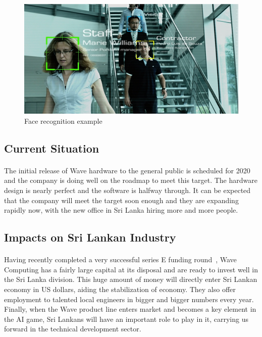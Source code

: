 \begin{figure}[H]
    \centering
    \includegraphics[trim=0cm 0cm 0cm 0cm, clip=true,scale=0.25]{figures/face_rec.png}
    \caption{Face recognition example\label{Fig:frec}}\vspace{-4mm}
    \end{figure}

\subsection{Current Situation}
\paragraph{}
The initial release of Wave hardware to the general public is scheduled for 2020 and the company is doing well on the roadmap to meet this target. The hardware design is nearly perfect and the software is halfway through. It can be expected that the company will meet the target soon enough and they are expanding rapidly now, with the new office in Sri Lanka hiring more and more people. 


\subsection{Impacts on Sri Lankan Industry}
\paragraph{}
Having recently completed a very successful series E funding round~\cite{fund}, Wave Computing has a fairly large capital at its disposal and are ready to invest well in the Sri Lanka division. This huge amount of money will directly enter Sri Lankan economy in US dollars, aiding the stabilization of economy. They also offer employment to talented local engineers in bigger and bigger numbers every year. Finally, when the Wave product line enters market and becomes a key element in the AI game, Sri Lankans will have an important role to play in it, carrying us forward in the technical development sector.

